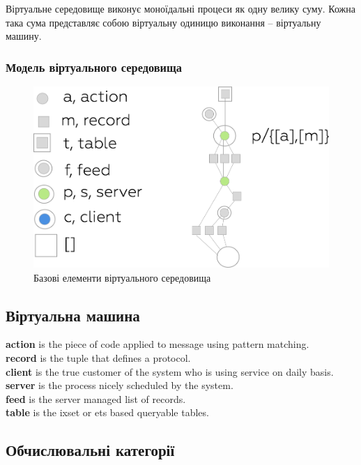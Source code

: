 \documentclass[11pt,oneside]{article}
\begin{document}
  Віртуальне середовище виконує моноїдальні процеси як одну велику суму.
  Кожна така сума представляє собою віртуальну одиницю виконання -- віртуальну машину.

\newpage

   \subsubsection*{Модель віртуального середовища}

\begin{figure}[h!]
\centering
\includegraphics[scale=0.3]{img/exe-legend}
\caption{Базові елементи віртуального середовища}
\end{figure}

\subsection*{Віртуальна машина}

{\bf action} is the piece of code applied to message using pattern matching.\\
{\bf record} is the tuple that defines a protocol.\\
{\bf client} is the true customer of the system who is using service on daily basis.\\
{\bf server} is the process nicely scheduled by the system.\\
{\bf feed} is the server managed list of records.\\
{\bf table} is the ixset or ets based queryable tables.\\

\subsection*{Обчислювальні категорії}
\end{document}
